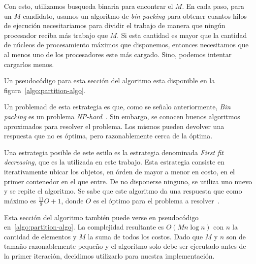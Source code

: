 Con esto, utilizamos busqueda binaria para encontrar el $M$. En cada paso, para
un $M$ candidato, usamos un algoritmo de \textit{bin packing} para obtener 
cuantos hilos de ejecuci\'on necesitariamos para dividir el trabajo de manera que
ning\'un procesador reciba m\'as trabajo que $M$. Si esta cantidad es mayor que
la cantidad de n\'ucleos de procesamiento m\'aximos que disponemos, entonces 
necesitamos que al menos uno de los procesadores este m\'as cargado. Sino, podemos
intentar cargarlos menos.

Un pseudoc\'odigo para esta secci\'on del algoritmo esta disponible en la figura~\ref{algo:partition-algo}.

Un problemad de esta estrategia es que, como se se\~nalo anteriormente, 
\textit{Bin packing} es un problema \textit{NP-hard}~\cite{NPCompleteness}. Sin
embargo, se conocen buenos algoritmos aproximados para resolver el problema. Los
mismos pueden devolver una respuesta que no es \'optima, pero razonablemente cerca
de la \'optima.

Una estrategia posible de este estilo es la estrategia denominada \textit{First
fit decreasing}, que es la utilizada en este trabajo. Esta estrategia consiste en 
iterativamente ubicar los objetos, en \'orden de mayor a menor en costo, 
en el primer contenedor en el que entre. De no disponerse ninguno, se utiliza
uno nuevo y se repite el algoritmo. Se sabe que este algoritmo da una respuesta
que como m\'aximo es $\frac{11}{9} O + 1$, donde $O$ es el \'optimo para el 
problema a resolver~\cite{FFDDemo}.

Esta secci\'on del algoritmo tambi\'en puede verse en pseudoc\'odigo en~\ref{algo:partition-algo}.
La complejidad resultante es $O(M n \log n)$ con $n$ la cantidad de elementos y $M$ la suma
de todos los costos. Dado que $M$ y $n$ son de tama\~no razonablemente peque\~no y el algoritmo
solo debe ser ejecutado antes de la primer iteraci\'on, decidimos utilizarlo para
nuestra implementaci\'on.

